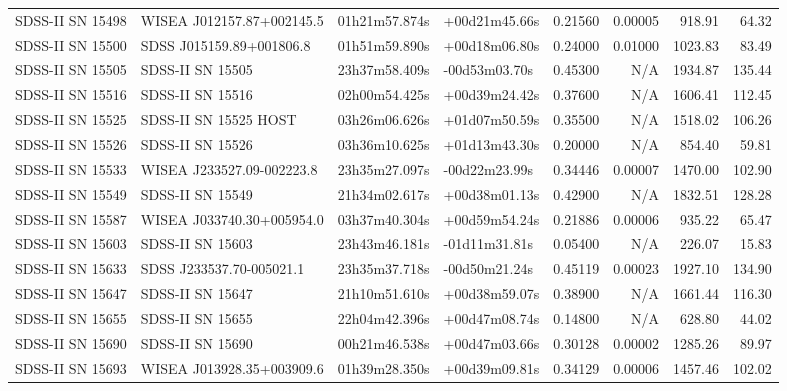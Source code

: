 \begin{longtable}{llllrrrr}
SDSS-II SN 15498 &       WISEA J012157.87+002145.5 &   01h21m57.874s &   +00d21m45.66s &  0.21560 &  0.00005 &   918.91 &       64.32 \\
SDSS-II SN 15500 &        SDSS J015159.89+001806.8 &   01h51m59.890s &   +00d18m06.80s &  0.24000 &  0.01000 &  1023.83 &       83.49 \\
SDSS-II SN 15505 &                SDSS-II SN 15505 &   23h37m58.409s &   -00d53m03.70s &  0.45300 &      N/A &  1934.87 &      135.44 \\
SDSS-II SN 15516 &                SDSS-II SN 15516 &   02h00m54.425s &   +00d39m24.42s &  0.37600 &      N/A &  1606.41 &      112.45 \\
SDSS-II SN 15525 &           SDSS-II SN 15525 HOST &   03h26m06.626s &   +01d07m50.59s &  0.35500 &      N/A &  1518.02 &      106.26 \\
SDSS-II SN 15526 &                SDSS-II SN 15526 &   03h36m10.625s &   +01d13m43.30s &  0.20000 &      N/A &   854.40 &       59.81 \\
SDSS-II SN 15533 &       WISEA J233527.09-002223.8 &   23h35m27.097s &   -00d22m23.99s &  0.34446 &  0.00007 &  1470.00 &      102.90 \\
SDSS-II SN 15549 &                SDSS-II SN 15549 &   21h34m02.617s &   +00d38m01.13s &  0.42900 &      N/A &  1832.51 &      128.28 \\
SDSS-II SN 15587 &       WISEA J033740.30+005954.0 &   03h37m40.304s &   +00d59m54.24s &  0.21886 &  0.00006 &   935.22 &       65.47 \\
SDSS-II SN 15603 &                SDSS-II SN 15603 &   23h43m46.181s &   -01d11m31.81s &  0.05400 &      N/A &   226.07 &       15.83 \\
SDSS-II SN 15633 &        SDSS J233537.70-005021.1 &   23h35m37.718s &   -00d50m21.24s &  0.45119 &  0.00023 &  1927.10 &      134.90 \\
SDSS-II SN 15647 &                SDSS-II SN 15647 &   21h10m51.610s &   +00d38m59.07s &  0.38900 &      N/A &  1661.44 &      116.30 \\
SDSS-II SN 15655 &                SDSS-II SN 15655 &   22h04m42.396s &   +00d47m08.74s &  0.14800 &      N/A &   628.80 &       44.02 \\
SDSS-II SN 15690 &                SDSS-II SN 15690 &   00h21m46.538s &   +00d47m03.66s &  0.30128 &  0.00002 &  1285.26 &       89.97 \\
SDSS-II SN 15693 &       WISEA J013928.35+003909.6 &   01h39m28.350s &   +00d39m09.81s &  0.34129 &  0.00006 &  1457.46 &      102.02 \\

\end{longtable}
